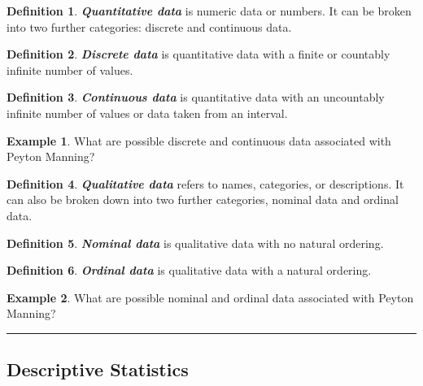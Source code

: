 \documentclass[
  11pt,
]{book}
\theoremstyle{definition}
\newtheorem{definition}{Definition}[chapter]
\theoremstyle{definition}
\newtheorem{example}{Example}[chapter]
\theoremstyle{definition}
\theoremstyle{definition}
\theoremstyle{remark}
\begin{document}
\begin{definition}
\textbf{\emph{Quantitative data}} is numeric data or numbers. It can be broken into two further categories: discrete and continuous data.
\end{definition}

\begin{definition}
\textbf{\emph{Discrete data}} is quantitative data with a finite or countably infinite number of values.
\end{definition}

\begin{definition}
\textbf{\emph{Continuous data}} is quantitative data with an uncountably infinite number of values or data taken from an interval.
\end{definition}

\begin{example}
What are possible discrete and continuous data associated with Peyton Manning?
\end{example}

\hfill\break
\hfill\break
\hfill\break
\hfill\break
\hfill\break

\begin{definition}
\textbf{\emph{Qualitative data}} refers to names, categories, or descriptions. It can also be broken down into
two further categories, nominal data and ordinal data.
\end{definition}

\begin{definition}
\textbf{\emph{Nominal data}} is qualitative data with no natural ordering.
\end{definition}

\begin{definition}
\textbf{\emph{Ordinal data}} is qualitative data with a natural ordering.
\end{definition}

\begin{example}
What are possible nominal and ordinal data associated with Peyton Manning?
\end{example}

\hfill\break
\hfill\break
\hfill\break
\hfill\break
\hfill\break

\begin{center}\rule{0.5\linewidth}{0.5pt}\end{center}

\hypertarget{descriptive-statistics-1}{%
\subsection{Descriptive Statistics}\label{descriptive-statistics-1}}
\end{document}
